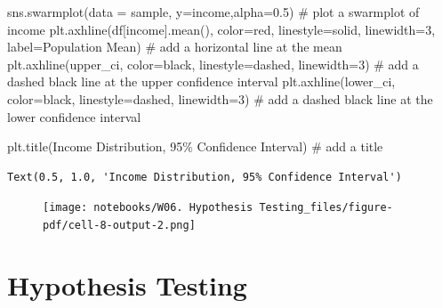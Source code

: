 \documentclass[
  letterpaper,
  DIV=11,
  numbers=noendperiod]{scrreprt}
\newenvironment{Shaded}{\begin{snugshade}}{\end{snugshade}}
\newcommand{\CommentTok}[1]{\textcolor[rgb]{0.37,0.37,0.37}{#1}}
\newcommand{\DecValTok}[1]{\textcolor[rgb]{0.68,0.00,0.00}{#1}}
\newcommand{\FloatTok}[1]{\textcolor[rgb]{0.68,0.00,0.00}{#1}}
\newcommand{\NormalTok}[1]{\textcolor[rgb]{0.00,0.23,0.31}{#1}}
\newcommand{\OperatorTok}[1]{\textcolor[rgb]{0.37,0.37,0.37}{#1}}
\newcommand{\StringTok}[1]{\textcolor[rgb]{0.13,0.47,0.30}{#1}}
\begin{document}
\begin{Shaded}
\begin{Highlighting}[]
\NormalTok{sns.swarmplot(data }\OperatorTok{=}\NormalTok{ sample, y}\OperatorTok{=}\StringTok{\textquotesingle{}income\textquotesingle{}}\NormalTok{,alpha}\OperatorTok{=}\FloatTok{0.5}\NormalTok{) }\CommentTok{\# plot a swarmplot of income}
\NormalTok{plt.axhline(df[}\StringTok{\textquotesingle{}income\textquotesingle{}}\NormalTok{].mean(), color}\OperatorTok{=}\StringTok{\textquotesingle{}red\textquotesingle{}}\NormalTok{, linestyle}\OperatorTok{=}\StringTok{\textquotesingle{}solid\textquotesingle{}}\NormalTok{, linewidth}\OperatorTok{=}\DecValTok{3}\NormalTok{, label}\OperatorTok{=}\StringTok{\textquotesingle{}Population Mean\textquotesingle{}}\NormalTok{) }\CommentTok{\# add a horizontal line at the mean}
\NormalTok{plt.axhline(upper\_ci, color}\OperatorTok{=}\StringTok{\textquotesingle{}black\textquotesingle{}}\NormalTok{, linestyle}\OperatorTok{=}\StringTok{\textquotesingle{}dashed\textquotesingle{}}\NormalTok{, linewidth}\OperatorTok{=}\DecValTok{3}\NormalTok{) }\CommentTok{\# add a dashed black line at the upper confidence interval}
\NormalTok{plt.axhline(lower\_ci, color}\OperatorTok{=}\StringTok{\textquotesingle{}black\textquotesingle{}}\NormalTok{, linestyle}\OperatorTok{=}\StringTok{\textquotesingle{}dashed\textquotesingle{}}\NormalTok{, linewidth}\OperatorTok{=}\DecValTok{3}\NormalTok{) }\CommentTok{\# add a dashed black line at the lower confidence interval}

\NormalTok{plt.title(}\StringTok{\textquotesingle{}Income Distribution, 95\% Confidence Interval\textquotesingle{}}\NormalTok{) }\CommentTok{\# add a title}
\end{Highlighting}
\end{Shaded}

\begin{verbatim}
Text(0.5, 1.0, 'Income Distribution, 95% Confidence Interval')
\end{verbatim}

\begin{figure}[H]

{\centering \texttt{[image: notebooks/W06. Hypothesis Testing\_files/figure-pdf/cell-8-output-2.png]}

}

\end{figure}

\hypertarget{hypothesis-testing-1}{%
\section{Hypothesis Testing}\label{hypothesis-testing-1}}
\end{document}
